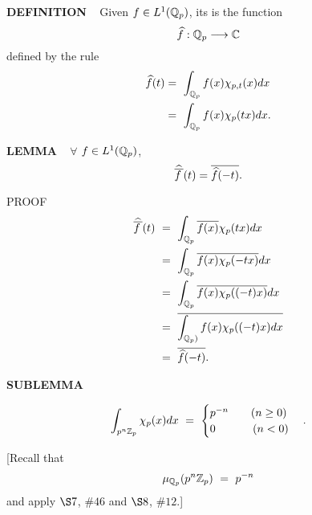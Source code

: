\vspace{0.1cm}

\begin{x}{\small\bf DEFINITION} \ %
Given $f \in L^1(\mathbb{Q}_p)$, its 
is the function 
\[
\widehat{f}:\mathbb{Q}_p \longrightarrow \mathbb{C}
\]
defined by the rule
\begin{align*}
\widehat{f}(t) 
&= \   \int_{\mathbb{Q}_p} f(x) \chi_{p,t}(x) dx\\
&= \ \int_{\mathbb{Q}_p} f(x) \chi_p(tx) dx.	
\end{align*}
\end{x}

\vspace{0.1cm}

\begin{x}{\small\bf LEMMA} \ %
$\forall$ $f \in L^1(\mathbb{Q}_p)$,
\[
\widehat{\overline{f\hspace{0.07cm}}}(t) = \overline{\widehat{f}(-t)}.
\]

\vspace{0.1cm}

PROOF \ 
\begin{align*}
\widehat{\overline{f\hspace{0.07cm}}}(t)   \ 	
&=\  \int_{\mathbb{Q}_p} \overline{f(x)} \chi_p(tx) dx \\
&=\  \int_{\mathbb{Q}_p} \overline{f(x) \chi_p(-tx)} dx \\
&=\  \int_{\mathbb{Q}_p} \overline{f(x) \chi_p((-t)x)} dx \\
&=\  \overline{\int_{\mathbb{Q}_p)} f(x) \chi_p((-t)x) dx} \\
&=\  \overline{\widehat{f}(-t)}. 
\end{align*}
\end{x}

\vspace{0.1cm}


\begin{x}{\small\bf SUBLEMMA} \ %

\[
\int_{p^n\Z_p} \chi_p(x) dx \ = \ 
\begin{cases}
p^{-n} \qquad (n \geq 0)\\
0 \qquad\quad \ (n < 0)
\end{cases}
.
\]

\vspace{0.1cm}

[Recall that 
\[
\mu_{\mathbb{Q}_p}(p^n \mathbb{Z}_p) \ = \  p^{-n}
\]
and apply $\S 7$, $\# 46$ and $\S 8$, $\# 12$.]
\end{x}

